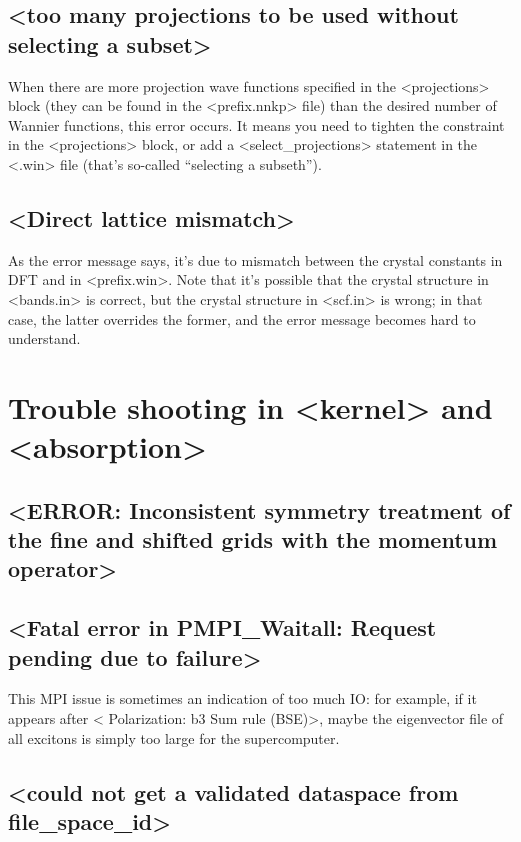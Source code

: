 \documentclass[hyperref, a4paper, 12pt]{report}
\def\texttt#1{<#1>}%
\newcommand{\shortcode}[1]{\texttt{#1}}
\begin{document}
\subsection{\shortcode{too many projections to be used without selecting a subset}}

When there are more 
projection wave functions specified in the \shortcode{projections} block 
(they can be found in the \shortcode{prefix.nnkp} file)
than the desired number of Wannier functions,
this error occurs.
It means you need to tighten the constraint in the \shortcode{projections} block, 
or add a \shortcode{select_projections} statement in the \shortcode{.win} file
(that's so-called ``selecting a subseth'').

\subsection{\shortcode{Direct lattice mismatch}}

As the error message says, 
it's due to mismatch between the crystal constants in DFT 
and in \shortcode{prefix.win}.
Note that it's possible that the crystal structure 
in \shortcode{bands.in} is correct, 
but the crystal structure in \shortcode{scf.in} is wrong; 
in that case, the latter overrides the former, 
and the error message becomes hard to understand. 

\section{Trouble shooting in \shortcode{kernel} and \shortcode{absorption}}

\subsection{\shortcode{ERROR: Inconsistent symmetry treatment of the fine and shifted grids with the momentum operator}}

\subsection{\shortcode{Fatal error in PMPI_Waitall: Request pending due to failure}}

This MPI issue is sometimes an indication of too much IO: 
for example, if it appears after \shortcode{ Polarization: b3 Sum rule (BSE)}, 
maybe the eigenvector file of all excitons 
is simply too large for the supercomputer. 

\subsection{\shortcode{could not get a validated dataspace from file_space_id}}
\end{document}
